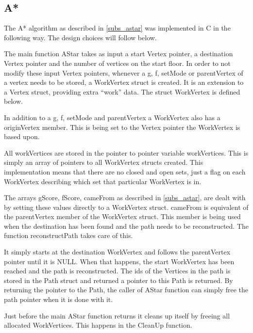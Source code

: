 \subsection{A*}



The A* algorithm as described in \cref{subs_astar} was implemented in C in the following way. The design choices will follow below.



The main function AStar takes as input a start Vertex pointer, a destination Vertex pointer and the number of vertices on the start floor. In order to not modify these input Vertex pointers, whenever a g, f, setMode or parentVertex of a vertex needs to be stored, a WorkVertex struct is created. It is an extension to a Vertex struct, providing extra \enquote{work} data. The struct WorkVertex is defined below.



In addition to a g, f, setMode and parentVertex a WorkVertex also has a originVertex member. This is being set to the Vertex pointer the WorkVertex is based upon. 

All workVertices are stored in the pointer to pointer variable workVertices. This is simply an array of pointers to all WorkVertex structs created. This implementation means that there are no closed and open sets, just a flag on each WorkVertex describing which set that particular WorkVertex is in. 

The arrays gScore, fScore, cameFrom as described in \cref{subs_astar}, are dealt with by setting these values directly to a WorkVertex struct. cameFrom is equivalent of the parentVertex member of the WorkVertex struct. This member is being used when the destination has been found and the path needs to be reconstructed. The function reconstructPath takes care of this.



It simply starts at the destination WorkVertex and follows the parentVertex pointer until it is NULL. When that happens, the start WorkVertex has been reached and the path is reconstructed. The ids of the Vertices in the path is stored in the Path struct and returned a pointer to this Path is returned. By returning the pointer to the Path, the caller of AStar function can simply free the path pointer when it is done with it.

Just before the main AStar function returns it cleans up itself by freeing all allocated WorkVertices. This happens in the CleanUp function.

